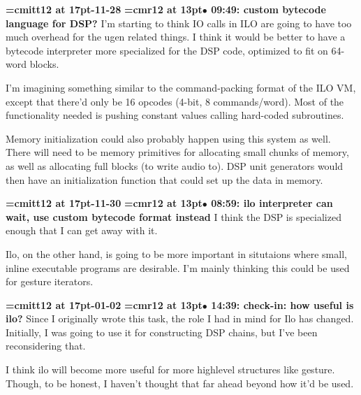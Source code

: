 {\medskip\noindent\bf\font\titlefont=cmitt12 at 17pt-11-28}\medskip
{\smallskip\noindent\bf\font\titlefont=cmr12 at 13pt\titlefont $\bullet$ 09:49: custom bytecode language for DSP?}\smallskip
I'm starting to think IO calls in ILO are going to have too much overhead for the ugen related things. I think it would be better to have a bytecode interpreter more specialized for the DSP code, optimized to fit on 64-word blocks.
\par

I'm imagining something similar to the command-packing format of the ILO VM, except that there'd only be 16 opcodes (4-bit, 8 commands/word). Most of the functionality needed is pushing constant values calling hard-coded subroutines.
\par

Memory initialization could also probably happen using this system as well. There will need to be memory primitives for allocating small chunks of memory, as well as allocating full blocks (to write audio to). DSP unit generators would then have an initialization function that could set up the data in memory.
\par

{\medskip\noindent\bf\font\titlefont=cmitt12 at 17pt-11-30}\medskip
{\smallskip\noindent\bf\font\titlefont=cmr12 at 13pt\titlefont $\bullet$ 08:59: ilo interpreter can wait, use custom bytecode format instead}\smallskip
I think the DSP is specialized enough that I can get away with it.
\par

Ilo, on the other hand, is going to be more important in situtaions where small, inline executable programs are desirable. I'm mainly thinking this could be used for  gesture iterators.
\par

{\medskip\noindent\bf\font\titlefont=cmitt12 at 17pt-01-02}\medskip
{\smallskip\noindent\bf\font\titlefont=cmr12 at 13pt\titlefont $\bullet$ 14:39: check-in: how useful is ilo?}\smallskip
Since I originally wrote this task, the role I had in mind for Ilo has changed. Initially, I was going to use it for constructing DSP chains, but I've been reconsidering that.
\par

I think ilo will become more useful for more highlevel structures like gesture. Though, to be honest, I haven't thought that far ahead beyond how it'd be used.
\par

